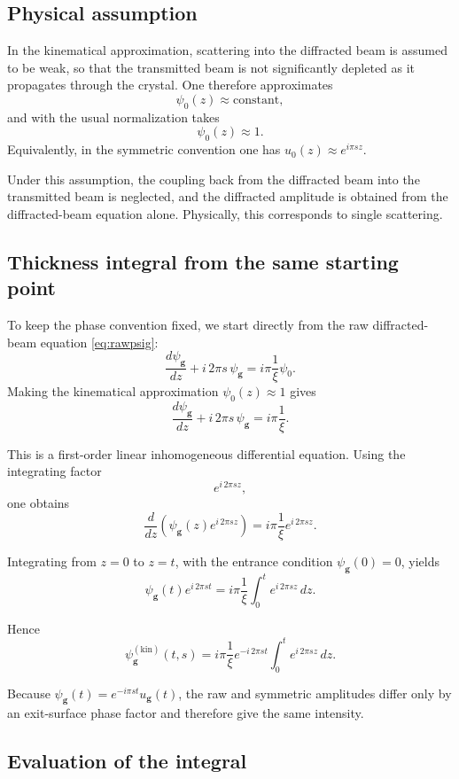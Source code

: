 \documentclass[11pt]{article}
\begin{document}
\subsection{Physical assumption}

In the kinematical approximation, scattering into the diffracted beam is assumed to be weak, so that the transmitted beam is not significantly depleted as it propagates through the crystal. One therefore approximates
\[
\psi_0(z)\approx \text{constant},
\]
and with the usual normalization takes
\[
\psi_0(z)\approx 1.
\]
Equivalently, in the symmetric convention one has \(u_0(z)\approx e^{i\pi s z}\).

Under this assumption, the coupling back from the diffracted beam into the transmitted beam is neglected, and the diffracted amplitude is obtained from the diffracted-beam equation alone. Physically, this corresponds to single scattering.

\subsection{Thickness integral from the same starting point}

To keep the phase convention fixed, we start directly from the raw diffracted-beam equation \eqref{eq:rawpsig}:
\[
\frac{d \psi_{\mathbf g}}{dz}
+ i\,2\pi s\,\psi_{\mathbf g}
=
i\pi \frac{1}{\xi}\psi_0.
\]
Making the kinematical approximation \(\psi_0(z)\approx 1\) gives
\[
\frac{d \psi_{\mathbf g}}{dz}
+ i\,2\pi s\,\psi_{\mathbf g}
=
i\pi \frac{1}{\xi}.
\]

This is a first-order linear inhomogeneous differential equation. Using the integrating factor
\[
e^{i\,2\pi s z},
\]
one obtains
\[
\frac{d}{dz}\left(\psi_{\mathbf g}(z)e^{i\,2\pi s z}\right)
=
i\pi \frac{1}{\xi} e^{i\,2\pi s z}.
\]

Integrating from \(z=0\) to \(z=t\), with the entrance condition \(\psi_{\mathbf g}(0)=0\), yields
\[
\psi_{\mathbf g}(t)e^{i\,2\pi s t}
=
i\pi \frac{1}{\xi}\int_0^t e^{i\,2\pi s z}\,dz.
\]

Hence
\[
\psi_{\mathbf g}^{(\mathrm{kin})}(t,s)
=
i\pi \frac{1}{\xi} e^{-i\,2\pi s t}\int_0^t e^{i\,2\pi s z}\,dz.
\]

Because \(\psi_{\mathbf g}(t)=e^{-i\pi s t}u_{\mathbf g}(t)\), the raw and symmetric amplitudes differ only by an exit-surface phase factor and therefore give the same intensity.

\subsection{Evaluation of the integral}
\end{document}
